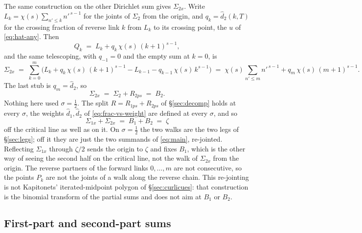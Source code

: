 \documentclass[11pt]{article}
\theoremstyle{definition}
\begin{document}
The same construction on the other Dirichlet sum gives \(\Sigma_{2x}\). Write
\(L_k=\chi(s)\sum_{n'\le k}n'^{\,s-1}\) for the joints of \(\Sigma_2\) from
the origin, and \(q_k=\hat d_2(k,T)\) for the crossing fraction of reverse
link \(k\) from \(L_k\) to its crossing point, the \(u\) of \eqref{eq:hat-any}. Then
\begin{equation}\label{eq:sum-2x-point}
Q_k
\;=\;
L_k+q_k\,\chi(s)\,(k+1)^{s-1},
\end{equation}
and the same telescoping, with \(q_{-1}=0\) and the empty sum at \(k=0\), is
\begin{equation}\label{eq:sum-2x}
\Sigma_{2x}
\;=\;
\sum_{k=0}^{m}\Biggl(
L_k+q_k\,\chi(s)\,(k+1)^{s-1}
-L_{k-1}-q_{k-1}\,\chi(s)\,k^{s-1}
\Biggr)
\;=\;
\chi(s)\sum_{n'\le m}n'^{\,s-1}+q_m\,\chi(s)\,(m+1)^{s-1}.
\end{equation}
The last stub is \(q_m=\hat d_2\), so
\begin{equation}\label{eq:sum-2x-B2}
\Sigma_{2x}
\;=\;
\Sigma_2+R_{2ps}
\;=\;
B_2.
\end{equation}
Nothing here used \(\sigma=\tfrac12\). The split
\(R=R_{1ps}+R_{2ps}\) of \S\ref{sec:decomp} holds at every \(\sigma\), the
weights \(\hat d_1,\hat d_2\) of \eqref{eq:frac-vs-weight} are defined at
every \(\sigma\), and so
\begin{equation}\label{eq:sum-x-zeta}
\Sigma_{1x}+\Sigma_{2x}
\;=\;
B_1+B_2
\;=\;
\zeta
\end{equation}
off the critical line as well as on it. On \(\sigma=\tfrac12\) the two walks
are the two legs of \S\ref{sec:legs}; off it they are just the two summands
of \eqref{eq:main}, re-jointed. Reflecting \(\Sigma_{1x}\) through
\(\zeta/2\) sends the origin to \(\zeta\) and fixes \(B_1\), which is the
other way of seeing the second half on the critical line, not the walk of
\(\Sigma_{2x}\) from the origin. The reverse partners of the forward links
\(0,\dots,m\) are not consecutive, so the points \(P_k\) are not the joints
of a walk along the reverse chain. This re-jointing is not Kapitonets'
iterated-midpoint polygon of \S\ref{sec:curlicues}: that construction is the
binomial transform of the partial sums and does not aim at \(B_1\) or
\(B_2\).

\subsection{First-part and second-part sums}\label{sec:half-link-sums}
\end{document}
